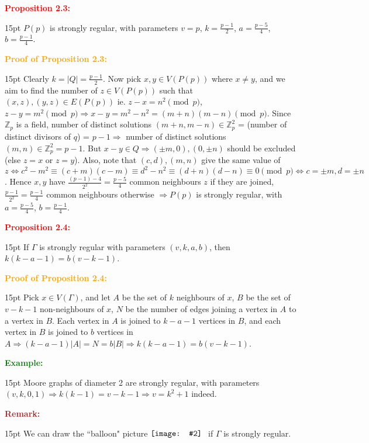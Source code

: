 \documentclass[12pt]{article}
\newcommand{\noparskip}{\vspace{-\parskip}}
\newenvironment{dent}
	{\begin{adjustwidth}{15pt}{}\noparskip}
	{\end{adjustwidth}}
\newenvironment{result}[1]
	{\textcolor{Red}{\textbf{#1:}}\begin{dent}}
	{\end{dent}}
\newenvironment{proof}[1]
	{\textcolor{Orange}{\textbf{Proof of #1:}}\begin{dent}}
	{\end{dent}}
\newenvironment{example}
	{\textcolor{Green}{\textbf{Example:}}\begin{dent}}
	{\end{dent}}
\newenvironment{remark}
	{\textcolor{Brown}{\textbf{Remark:}}\begin{dent}}
	{\end{dent}}
\newcommand{\pic}[2][1.0]{
	$\vcenter{\hbox{\texttt{[image: \#2]}\ }}$}
\renewcommand{\implies}{\Rightarrow}
\renewcommand{\iff}{\Leftrightarrow}
\newcommand{\sizeof}[1]{\left| #1 \right|}
\newcommand{\Z}{\mathbb{Z}}
\begin{document}
\begin{result}{Proposition 2.3}
$P(p)$ is strongly regular, with parameters $v = p$, $k = \frac{p - 1}{2}$, $a = \frac{p - 5}{4}$, $b = \frac{p - 1}{4}$.
\end{result}

\begin{proof}{Proposition 2.3}
Clearly $k = \sizeof{Q} = \frac{p - 1}{2}$. Now pick $x, y \in V(P(p))$ where $x \ne y$, and we aim to find the number of $z \in V(P(p))$ such that $(x, z), (y, z) \in E(P(p))$ ie. $z - x = n^2 \pmod{p}$, $z - y = m^2 \pmod{p} \implies x - y = m^2 - n^2 = (m + n)(m - n) \pmod{p}$. Since $\Z_p$ is a field, number of distinct solutions $(m + n, m - n) \in \Z_p^2$ = (number of distinct divisors of $q$) = $p - 1 \implies$ number of distinct solutions $(m, n) \in \Z_p^2 = p - 1$. But $x - y \in Q \implies (\pm m, 0), (0, \pm n)$ should be excluded (else $z = x$ or $z = y$). Also, note that $(c, d), (m, n)$ give the same value of $z \iff c^2 - m^2 \equiv (c + m)(c - m) \equiv d^2 - n^2 \equiv (d + n)(d - n) \equiv 0 \pmod{p} \iff c = \pm m, d = \pm n$. Hence $x, y$ have $\frac{(p - 1) - 4}{2^2} = \frac{p - 5}{4}$ common neighbours $z$ if they are joined, $\frac{p - 1}{2^2} = \frac{p - 1}{4}$ common neighbours otherwise $\implies P(p)$ is strongly regular, with $a = \frac{p - 5}{4}$, $b = \frac{p - 1}{4}$.
\end{proof}

\begin{result}{Proposition 2.4}
If $\Gamma$ is strongly regular with parameters $(v, k, a, b)$, then $k(k - a - 1) = b(v - k - 1)$.
\end{result}

\begin{proof}{Proposition 2.4}
Pick $x \in V(\Gamma)$, and let $A$ be the set of $k$ neighbours of $x$, $B$ be the set of $v - k - 1$ non-neighbours of $x$, $N$ be the number of edges joining a vertex in $A$ to a vertex in $B$. Each vertex in $A$ is joined to $k - a - 1$ vertices in $B$, and each vertex in $B$ is joined to $b$ vertices in $A \implies (k - a - 1) \sizeof{A} = N = b \sizeof{B} \implies k(k - a - 1) = b(v - k - 1)$.
\end{proof}

\begin{example}
Moore graphs of diameter 2 are strongly regular, with parameters $(v, k, 0, 1) \implies k(k - 1) = v - k - 1 \implies v = k^2 + 1$ indeed.
\end{example}

\begin{remark}
We can draw the ``balloon" picture \pic[0.3]{11.png} if $\Gamma$ is strongly regular.
\end{remark}
\end{document}
